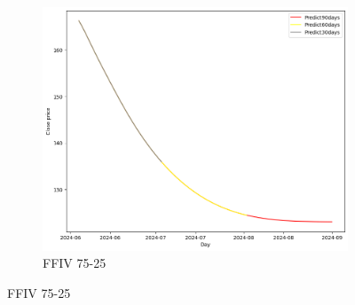 \documentclass{ieeeojies}
\begin{document}
\begin{figure}[H]
    \hfill
    \begin{subfigure}[b]{0.33\linewidth}
        \centering
        \includegraphics[width=\linewidth]{LSTM Plot/FFIV_LSTM_75_25-90.png}
        \caption{FFIV 75-25}
        \label{fig:ffiv-75-25}
    \end{subfigure}
\end{figure}
\end{document}
